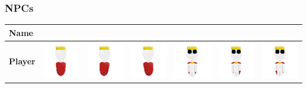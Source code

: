 \documentclass[../Main.tex]{subfiles}
\begin{document}
        \clearpage
        \subsubsection{NPCs}
            \begin{center}
                \begin{tabular}{ | m{} | m{} m{} m{} m{} m{} m{} | }
                    \hline
                    \textbf{Name} & & & & & & \\
                    \hline
                    \multirow{2}{*}{\textbf{Player}} & \centerline{\includegraphics[scale=3]{../res/textures/entities/player/heir/North.png}} & \centerline{\includegraphics[scale=3]{../res/textures/entities/player/heir/North-Walk-1.png}} & \centerline{\includegraphics[scale=3]{../res/textures/entities/player/heir/North-Walk-2.png}} & \centerline{\includegraphics[scale=3]{../res/textures/entities/player/heir/South.png}} & \centerline{\includegraphics[scale=3]{../res/textures/entities/player/heir/South-Walk-1.png}} & \centerline{\includegraphics[scale=3]{../res/textures/entities/player/heir/South-Walk-2.png}} \\

\end{tabular}
\end{center}
\end{document}
